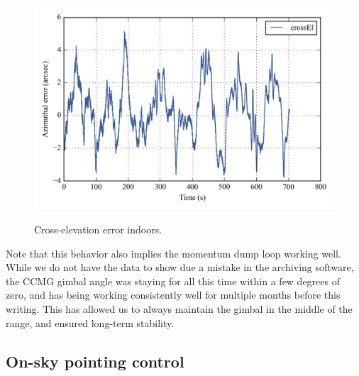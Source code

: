 
\begin{figure}[!h]
\begin{center}
\includegraphics{Figures/simplePlot_crossEl.png}
\label{fig:simplePlot_crossEl}
\vspace{-0.5cm}
\caption[Cross-elevation error indoors]{Cross-elevation error indoors.}
\end{center}
\end{figure}

Note that this behavior also implies the momentum dump loop working well. While we do not have the data to show due a mistake in the archiving software, the CCMG gimbal angle was staying for all this time within a few degrees of zero, and has being working consistently well for multiple months before this writing. This has allowed us to always maintain the gimbal in the middle of the range, and ensured long-term stability.

\subsection{On-sky pointing control}


